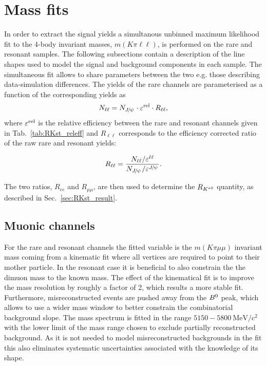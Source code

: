 \chapter{Mass fits}
\label{sec:rkst_fits}

In order to extract the signal yields a simultanous unbinned maximum likelihood fit
to the 4-body invariant masses, $m(K\pi\ell\ell)$, is performed on the rare and resonant samples.
The following subsections contain a description of the line shapes used to model
the signal and background components in each sample.
The simultaneous fit allows to share parameters between the two e.g. those describing data-simulation differences.
The yields of the rare channels are parameterised as a function of the corresponding \jpsi yields as
%
\begin{equation}
N_{\ell\ell} = N_{\jpsi} \cdot \varepsilon^{\rm rel} \cdot R_{\ell\ell},
\end{equation}
%
where $\varepsilon^{\rm rel}$ is the relative efficiency between the rare and resonant channels
given in Tab.~\ref{tab:RKst_releff} and
$R_{\ell\ell}$ corresponds to the efficiency corrected ratio of the raw rare and resonant yields:

\begin{equation}
R_{\ell\ell} = \frac{N_{\ell\ell} / \varepsilon^{\ell\ell}}{N_{\jpsi} / \varepsilon^{\jpsi}}.
\end{equation}

The two ratios, $R_{ee}$ and $R_{\mu\mu}$, are then used to determine
the $R_{{{K}^{*0}}}$ quantity, as described in Sec.~\ref{sec:RKst_result}.


\section{Muonic channels}

For the rare and resonant \mumu channels the fitted variable is the $m(K\pi \mu\mu)$ invariant mass coming
from a kinematic fit where all vertices are required to point to their mother particle.
In the resonant case it is beneficial to also constrain the the dimuon mass to the known \jpsi mass.
The effect of the kinematical fit is to improve the mass resolution by roughly a factor of 2, which results
a more stable fit. Furthermore, misreconstructed events are pushed away from the ${{B}^0}$ peak, which allows to
use a wider mass window to better constrain the combinatorial background slope.
The mass spectrum is fitted in the range $5150 - 5800 ~\mbox{MeV/c}{^2}$ with the lower limit
of the mass range chosen to exclude partially reconstructed background.
As it is not needed to model misreconstructed backgrounds in the fit this also
eliminates systematic uncertainties associated with the knowledge of its shape. 

